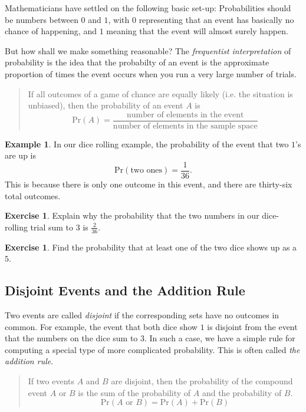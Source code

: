 \documentclass[12pt,letterpaper]{article}
\theoremstyle{definition}
\newtheorem{example}{Example}
\newtheorem{exercise}[question]{Exercise}
\begin{document}
Mathematicians have settled on the following basic set-up: Probabilities should be numbers between $0$ and $1$, with $0$ representing that an event has basically no chance of happening, and $1$ meaning that the event will almost surely happen.

But how shall we make something reasonable? The \emph{frequentist interpretation} of probability is the idea that the probabilty of an event is the approximate proportion of times the event occurs when you run a very large number of trials.

\begin{quote}
If all outcomes of a game of chance are equally likely (i.e. the situation is unbiased), then the probability of an event $A$ is
\[ \mathrm{Pr}(A) =\dfrac{\text{number of elements in the event}}{\text{number of elements in the sample space}}\]
\end{quote}

\begin{example}
In our dice rolling example, the probability of the event that two $1$'s are up is
\[
\mathrm{Pr}(\text{two ones}) = \dfrac{1}{36}.
\]
This is because there is only one outcome in this event, and there are thirty-six total outcomes.
\end{example}

\begin{exercise}
Explain why the probability that the two numbers in our dice-rolling trial sum to 3 is $\frac{2}{36}$.
\end{exercise}

\begin{exercise}
Find the probability that at least one of the two dice shows up as a $5$.
\end{exercise}


\subsection*{Disjoint Events and the Addition Rule}

Two events are called \emph{disjoint} if the corresponding sets have no outcomes in common.
For example, the event that both dice show $1$ is disjoint from the event that the numbers on the dice sum to $3$.
In such a case, we have a simple rule for computing a special type of more complicated probability.
This is often called \emph{the addition rule}.

\begin{quote}
If two events $A$ and $B$ are disjoint, then the probability of the compound event $A$ or $B$ is the sum of the probability of $A$ and the probability of $B$.
\[
\mathrm{Pr}(\text{$A$ or $B$}) = \mathrm{Pr}(A) + \mathrm{Pr}(B)
\]
\end{quote}
\end{document}
